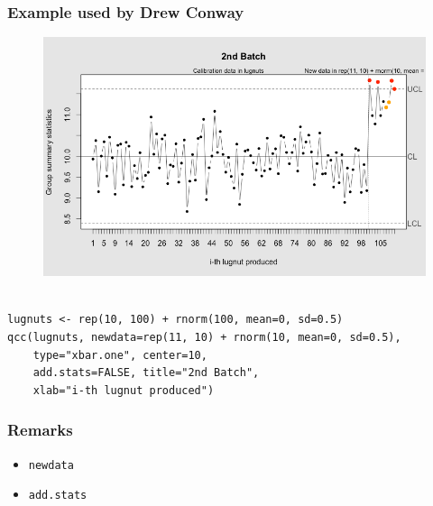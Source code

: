 \documentclass[]{article}
\begin{document}
\subsubsection{Example used by Drew Conway}
\begin{figure}[h!]
\centering
\includegraphics[width=0.7\linewidth]{./qcc_holdout2}
\caption{}
\label{fig:qcc_holdout2}
\end{figure}
\begin{framed}
\begin{verbatim} 

lugnuts <- rep(10, 100) + rnorm(100, mean=0, sd=0.5)
qcc(lugnuts, newdata=rep(11, 10) + rnorm(10, mean=0, sd=0.5),
    type="xbar.one", center=10, 
    add.stats=FALSE, title="2nd Batch", 
    xlab="i-th lugnut produced")
\end{verbatim}
\end{framed}

\subsubsection{Remarks}
{\large
\begin{itemize}
\item \texttt{newdata}
\item \texttt{add.stats }
\end{itemize}}
\newpage
\end{document}
